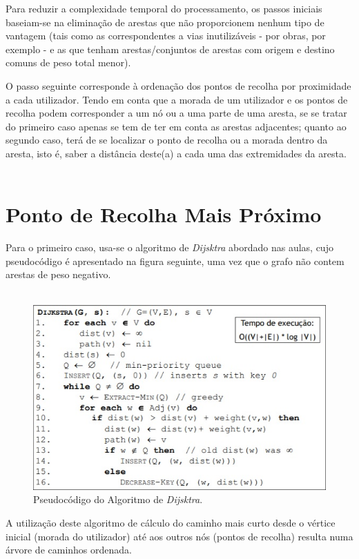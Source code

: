 \documentclass[article, a4paper, 12pt, oneside]{memoir}
\begin{document}
Para reduzir a complexidade temporal do processamento, os passos iniciais baseiam-se na eliminação de arestas que não proporcionem nenhum tipo de vantagem (tais como as correspondentes a vias inutilizáveis - por obras, por exemplo - e as que tenham arestas/conjuntos de arestas com origem e destino comuns de peso total menor).

O passo seguinte corresponde à ordenação dos pontos de recolha por proximidade a cada utilizador. Tendo em conta que a morada de um utilizador e os pontos de recolha podem corresponder a um nó ou a uma parte de uma aresta, se se tratar do primeiro caso apenas se tem de ter em conta as arestas adjacentes; quanto ao segundo caso, terá de se localizar o ponto de recolha ou a morada dentro da aresta, isto é, saber a distância deste(a) a cada uma das extremidades da aresta.\\\

\section{Ponto de Recolha Mais Próximo}

Para o primeiro caso, usa-se o algoritmo de \textit{Dijsktra} abordado nas aulas, cujo pseudocódigo é apresentado na figura seguinte, uma vez que o grafo não contem arestas de peso negativo. \\\

\begin{figure}[h!]
  \centerline{\includegraphics[scale=1]{Dijkstra_pseudocode.jpg}}
  \caption{Pseudocódigo do Algoritmo de \textit{Dijsktra}.}
\end{figure}

A utilização deste algoritmo de cálculo do caminho mais curto desde o vértice inicial (morada do utilizador) até aos outros nós (pontos de recolha) resulta numa árvore de caminhos ordenada.
\end{document}

